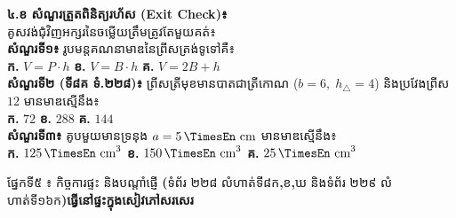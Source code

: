 \documentclass[a4paper,10pt]{article}
\newcommand{\en}[1]{{\TimesEn #1}}
\newcommand{\enbf}[1]{{\TimesEn\textbf{#1}}}
\newcommand{\unit}[1]{\,\text{\en{#1}}}
\newcommand{\tri}[1]{\ensuremath{\triangle #1}}
\newcommand{\secbar}[2]{%
  \vspace{3pt}%
  \begin{tcolorbox}[
    enhanced, sharp corners, colback=headgray, colframe=black,
    boxrule=0.9pt, boxsep=1pt, top=2.5pt, bottom=2.5pt, left=6pt, right=6pt,
    after skip=3pt
  ]
    {\muol\fontsize{9.2pt}{13.5pt}\selectfont #1}\hfill{\fontsize{8.3pt}{11.5pt}\selectfont\textbf{#2}}
  \end{tcolorbox}%
}
\begin{document}
\begin{minipage}[t]{8.6cm}\vspace{0pt}
  \begin{tcolorbox}[
    enhanced, sharp corners, colback=white, colframe=black, equal height group=rowE5,
    boxrule=0.85pt, boxsep=3.5pt, top=8pt, bottom=8pt, left=5.5pt, right=5.5pt
  ]\raggedright
    \textbf{៤.ខ សំណួរត្រួតពិនិត្យរហ័ស (\en{Exit Check})៖}\\
    គូសវង់ជុំវិញអក្សរនៃចម្លើយត្រឹមត្រូវតែមួយគត់៖\\[7.5pt]
    \textbf{សំណួរទី១៖} រូបមន្តគណនាមាឌនៃព្រីសត្រង់ទូទៅគឺ៖\\[3pt]
    \hspace*{0.15cm}\textbf{ក.} $V = P \cdot h$ \hspace{0.55cm} \textbf{ខ.} $V = B \cdot h$ \hspace{0.55cm} \textbf{គ.} $V = 2B + h$\\[8.5pt]
    \textbf{សំណួរទី២ (ទី៨គ ទំ.២២៨)៖} ព្រីសត្រីមុខមានបាតជាត្រីកោណ ($b=6,\; h_{\tri{}}=4$) និងប្រវែងព្រីស $12$ មានមាឌស្មើនឹង៖\\[3pt]
    \hspace*{0.15cm}\textbf{ក.} $72$ \hspace{0.85cm} \textbf{ខ.} $288$ \hspace{0.85cm} \textbf{គ.} $144$\\[8.5pt]
    \textbf{សំណួរទី៣៖} គូបមួយមានទ្រនុង $a = 5\unit{cm}$ មានមាឌស្មើនឹង៖\\[3pt]
    \hspace*{0.15cm}\textbf{ក.} $125\unit{cm}^3$ \hspace{0.55cm} \textbf{ខ.} $150\unit{cm}^3$ \hspace{0.55cm} \textbf{គ.} $25\unit{cm}^3$
  \end{tcolorbox}
\end{minipage}

\vspace{16pt}
\secbar{ផ្នែកទី៥ ៖ កិច្ចការផ្ទះ និងបណ្ដាំផ្ញើ \enbf{(}ទំព័រ ២២៨ លំហាត់ទី៨ក\enbf{,}ខ\enbf{,}ឃ និងទំព័រ ២២៩ លំហាត់ទី១៦ក\enbf{)}}{ធ្វើនៅផ្ទះក្នុងសៀវភៅសរសេរ}
\end{document}
